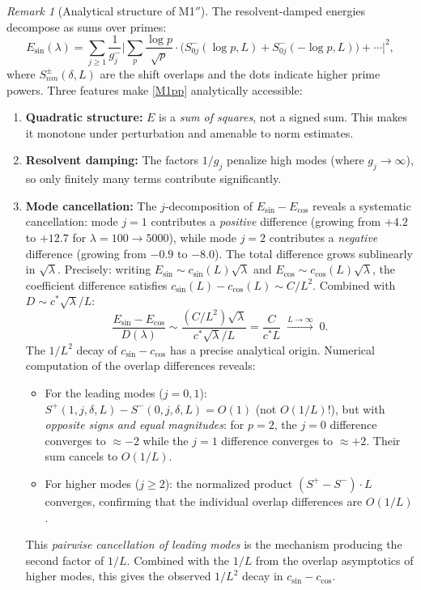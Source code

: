 \documentclass[12pt,a4paper]{article}
\theoremstyle{definition}
\theoremstyle{remark}
\newtheorem{remark}[theorem]{Remark}
\begin{document}
\begin{remark}[Analytical structure of M1$''$]
\label{rem:M1-analytical}
The resolvent-damped energies decompose as sums over primes:
\[
  E_{\sin}(\lambda) = \sum_{j \geq 1} \frac{1}{g_j^-} \biggl|\sum_p \frac{\log p}{\sqrt{p}} \cdot \bigl(S^-_{0j}(\log p, L) + S^-_{0j}(-\log p, L)\bigr) + \cdots\biggr|^2,
\]
where $S^\pm_{nm}(\delta, L)$ are the shift overlaps and the dots indicate higher prime powers. Three features make \ref{M1pp} analytically accessible:
\begin{enumerate}
  \item \textbf{Quadratic structure:} $E$ is a \emph{sum of squares}, not a signed sum. This makes it monotone under perturbation and amenable to norm estimates.
  \item \textbf{Resolvent damping:} The factors $1/g_j$ penalize high modes (where $g_j \to \infty$), so only finitely many terms contribute significantly.
  \item \textbf{Mode cancellation:} The $j$-decomposition of $E_{\sin} - E_{\cos}$ reveals a systematic cancellation: mode $j = 1$ contributes a \emph{positive} difference (growing from $+4.2$ to $+12.7$ for $\lambda = 100 \to 5000$), while mode $j = 2$ contributes a \emph{negative} difference (growing from $-0.9$ to $-8.0$). The total difference grows sublinearly in $\sqrt{\lambda}$. Precisely: writing $E_{\sin} \sim c_{\sin}(L)\sqrt{\lambda}$ and $E_{\cos} \sim c_{\cos}(L)\sqrt{\lambda}$, the coefficient difference satisfies $c_{\sin}(L) - c_{\cos}(L) \sim C/L^2$. Combined with $D \sim c^*\sqrt{\lambda}/L$:
  \[
    \frac{E_{\sin} - E_{\cos}}{D(\lambda)} \sim \frac{(C/L^2)\sqrt{\lambda}}{c^*\sqrt{\lambda}/L} = \frac{C}{c^* L} \;\xrightarrow{L \to \infty}\; 0.
  \]
  The $1/L^2$ decay of $c_{\sin} - c_{\cos}$ has a precise analytical origin. Numerical computation of the overlap differences reveals:
  \begin{itemize}
    \item For the leading modes ($j = 0, 1$): $S^+(1,j,\delta,L) - S^-(0,j,\delta,L) = O(1)$ (not $O(1/L)$!), but with \emph{opposite signs and equal magnitudes}: for $p = 2$, the $j = 0$ difference converges to $\approx -2$ while the $j = 1$ difference converges to $\approx +2$. Their sum cancels to $O(1/L)$.
    \item For higher modes ($j \geq 2$): the normalized product $(S^+ - S^-) \cdot L$ converges, confirming that the individual overlap differences are $O(1/L)$.
  \end{itemize}
  This \emph{pairwise cancellation of leading modes} is the mechanism producing the second factor of $1/L$. Combined with the $1/L$ from the overlap asymptotics of higher modes, this gives the observed $1/L^2$ decay in $c_{\sin} - c_{\cos}$.
\end{enumerate}
\end{remark}
\end{document}
